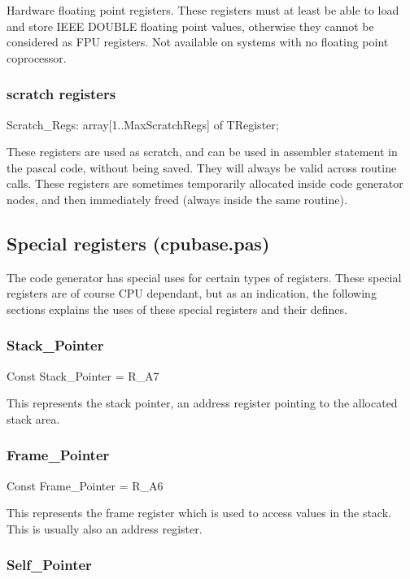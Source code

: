 \documentclass [a4paper,12pt]{article}
\begin{document}
Hardware floating point registers. These registers must at least be able to
load and store IEEE DOUBLE floating point values, otherwise they cannot be
considered as FPU registers. Not available on systems with no floating point
coprocessor.

\subsubsection{scratch registers}
\label{subsubsec:scratch}

\textsf{Scratch{\_}Regs: array[1..MaxScratchRegs] of TRegister;}

These registers are used as scratch, and can be used in assembler statement
in the pascal code, without being saved. They will always be valid across
routine calls. These registers are sometimes temporarily allocated inside
code generator nodes, and then immediately freed (always inside the same
routine).

\subsection{Special registers (cpubase.pas)}
\label{subsec:special}

The code generator has special uses for certain types of registers. These
special registers are of course CPU dependant, but as an indication, the
following sections explains the uses of these special registers and their
defines.

\subsubsection{Stack{\_}Pointer}
\label{subsubsec:stack}

\textsf{Const Stack{\_}Pointer = R{\_}A7}

This represents the stack pointer, an address register pointing to the
allocated stack area.

\subsubsection{Frame{\_}Pointer}
\label{subsubsec:frame}

\textsf{Const Frame{\_}Pointer = R{\_}A6}

This represents the frame register which is used to access values in the
stack. This is usually also an address register.

\subsubsection{Self{\_}Pointer}
\label{subsubsec:mylabel26}
\end{document}
